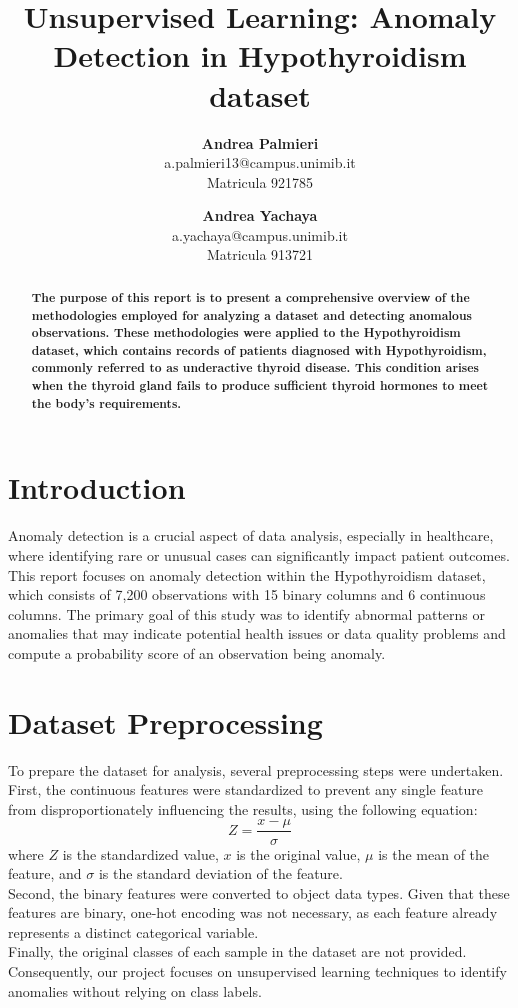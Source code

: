 \documentclass[a4paper]{article}
\title{Unsupervised Learning: Anomaly Detection in Hypothyroidism dataset}
\author{
\textbf{Andrea Palmieri} \\  a.palmieri13@campus.unimib.it \\ Matricula  921785
\and
\textbf{Andrea Yachaya} \\ a.yachaya@campus.unimib.it \\ Matricula 913721
}
\begin{document}
\maketitle

\begin{abstract}
\textbf{The purpose of this report is to present a comprehensive overview of the methodologies employed for analyzing a dataset and detecting anomalous observations. These methodologies were applied to the Hypothyroidism dataset, which contains records of patients diagnosed with Hypothyroidism, commonly referred to as underactive thyroid disease. This condition arises when the thyroid gland fails to produce sufficient thyroid hormones to meet the body's requirements.}
\end{abstract}


\section{Introduction}

Anomaly detection is a crucial aspect of data analysis, especially in healthcare, where identifying rare or unusual cases can significantly impact patient outcomes. This report focuses on anomaly detection within the Hypothyroidism dataset, which consists of 7,200 observations with 15 binary columns and 6 continuous columns. The primary goal of this study was to identify abnormal patterns or anomalies that may indicate potential health issues or data quality problems and compute a probability score of an observation being anomaly.


\section{Dataset Preprocessing}
To prepare the dataset for analysis, several preprocessing steps were undertaken. First, the continuous features were standardized to prevent any single feature from disproportionately influencing the results, using the following equation:
\begin{equation}
Z = \frac{x - \mu}{\sigma}
\end{equation}
where \( Z \) is the standardized value, \( x \) is the original value, \( \mu \) is the mean of the feature, and \( \sigma \) is the standard deviation of the feature.
\\Second, the binary features were converted to object data types. Given that these features are binary, one-hot encoding was not necessary, as each feature already represents a distinct categorical variable.
\\Finally, the original classes of each sample in the dataset are not provided. Consequently, our project focuses on unsupervised learning techniques to identify anomalies without relying on class labels.
\end{document}
